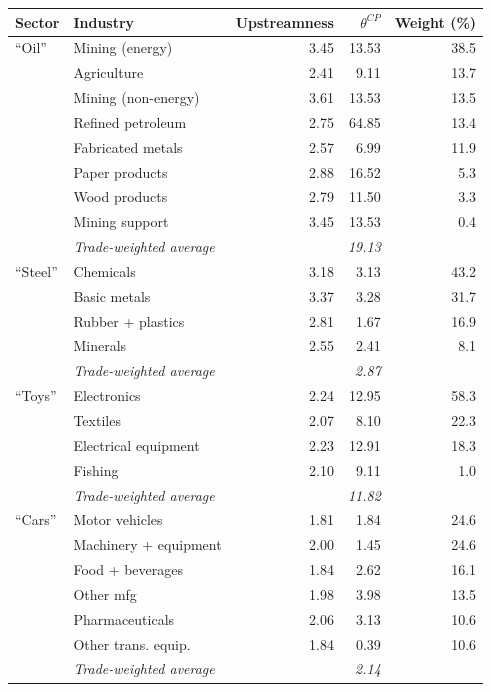 \begin{tabular}{llrrr}
\toprule
Sector & Industry & Upstreamness & $\theta^{CP}$ & Weight (\%) \\
\midrule
``Oil'' & Mining (energy) & 3.45 & 13.53 & 38.5 \\
 & Agriculture & 2.41 & 9.11 & 13.7 \\
 & Mining (non-energy) & 3.61 & 13.53 & 13.5 \\
 & Refined petroleum & 2.75 & 64.85 & 13.4 \\
 & Fabricated metals & 2.57 & 6.99 & 11.9 \\
 & Paper products & 2.88 & 16.52 & 5.3 \\
 & Wood products & 2.79 & 11.50 & 3.3 \\
 & Mining support & 3.45 & 13.53 & 0.4 \\
& \textit{Trade-weighted average} & & \textit{19.13} & \\
\midrule
``Steel'' & Chemicals & 3.18 & 3.13 & 43.2 \\
 & Basic metals & 3.37 & 3.28 & 31.7 \\
 & Rubber + plastics & 2.81 & 1.67 & 16.9 \\
 & Minerals & 2.55 & 2.41 & 8.1 \\
& \textit{Trade-weighted average} & & \textit{2.87} & \\
\midrule
``Toys'' & Electronics & 2.24 & 12.95 & 58.3 \\
 & Textiles & 2.07 & 8.10 & 22.3 \\
 & Electrical equipment & 2.23 & 12.91 & 18.3 \\
 & Fishing & 2.10 & 9.11 & 1.0 \\
& \textit{Trade-weighted average} & & \textit{11.82} & \\
\midrule
``Cars'' & Motor vehicles & 1.81 & 1.84 & 24.6 \\
 & Machinery + equipment & 2.00 & 1.45 & 24.6 \\
 & Food + beverages & 1.84 & 2.62 & 16.1 \\
 & Other mfg & 1.98 & 3.98 & 13.5 \\
 & Pharmaceuticals & 2.06 & 3.13 & 10.6 \\
 & Other trans. equip. & 1.84 & 0.39 & 10.6 \\
& \textit{Trade-weighted average} & & \textit{2.14} & \\
\bottomrule
\end{tabular}
